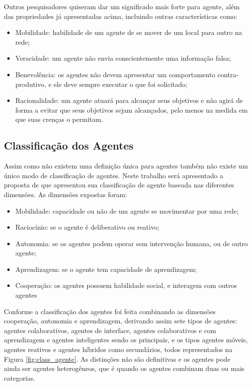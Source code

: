 Outros pesquisadores quiseram dar um significado mais forte para agente, além das propriedades já apresentadas acima, incluindo outras características como:

\begin{itemize}
\item Mobilidade: habilidade de um agente de se mover de um local para outro na rede;
\item Veracidade: um agente não envia conscientemente uma informação falsa;
\item Benevolência: os agentes não devem apresentar um comportamento contra-produtivo, e ele deve sempre executar o que foi solicitado;
\item Racionalidade: um agente atuará para alcançar seus objetivos e não agirá de forma a evitar que seus objetivos sejam alcançados, pelo menos na medida em que suas crenças o permitam.
\end{itemize}

\subsection{Classificação dos Agentes}

Assim como não existem uma definição única para agentes também não existe um único modo de classificação de agentes. Neste trabalho será apresentado a proposta de \citet{nwana1996software} que apresentou sua classificação de agente baseada nas diferentes dimensões. As dimensões expostas foram:

\begin{itemize}
\item Mobilidade: capacidade ou não de um agente se movimentar por uma rede;
\item Raciocínio: se o agente é deliberativo ou reativo;
\item Autonomia: se os agentes podem operar sem intervenção humana, ou de outro agente;
\item Aprendizagem: se o agente tem capacidade de aprendizagem;
\item Cooperação: os agentes possuem habilidade social, e interagem com outros agentes
\end{itemize}

 Conforme \cite{nwana1996software} a classificação dos agentes foi feita  combinando as dimensões cooperação, autonomia e aprendizagem, derivando assim sete tipos de agentes: agentes colaborativos, agentes de interface, agentes colaborativos e com aprendizagem e agentes inteligentes sendo os principais, e os tipos  agentes móveis, agentes reativos e agentes híbridos como secundários, todos representados na Figura \ref{fig:class_agente}. As distinções não são definitivas e os agentes pode ainda ser agentes heterogêneos, que é quando os agentes combinam duas ou mais categorias.



